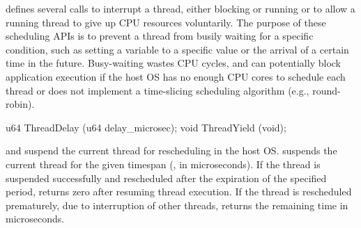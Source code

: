 
\Thehostabi{} defines several calls to interrupt a thread, either blocking or running
or to allow a running thread to give up CPU resources voluntarily.
The purpose of these scheduling APIs is to prevent a thread from busily waiting for a specific condition,
such as setting a variable to a specific value or the arrival of a certain time in the future.
Busy-waiting wastes CPU cycles,
and can potentially block application execution
if the host OS
has no enough CPU cores to schedule each thread or does not
implement a time-slicing scheduling algorithm (e.g., round-robin).






\begin{paldef}
u64  ThreadDelay (u64 delay_microsec);
void ThreadYield (void);
\end{paldef}


 and  suspend the current thread for rescheduling in the host OS.
 suspends the current thread
for the given timespan (, in microseconds).
If the thread is suspended successfully and rescheduled after the expiration of the specified period,
 returns zero after resuming thread execution.
If the thread is rescheduled prematurely, due to interruption of other threads,
 returns the remaining time in microseconds.


